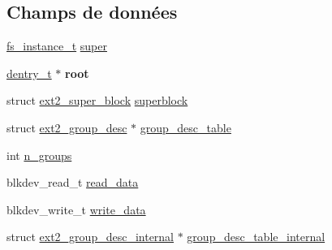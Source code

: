 \subsection*{Champs de données}
\begin{DoxyCompactItemize}
\item 
\hyperlink{vfs_8h_a0eefa9aac35a5462ebf1e038992ca860}{fs\-\_\-instance\-\_\-t} \hyperlink{struct__ext2__fs__instance__t_a456ee695fb1a0b71edadda9f4504ca2d}{super}
\item 
\hypertarget{struct__ext2__fs__instance__t_a52f883f2d709ab3b4dff94b5b7100973}{\hyperlink{vfs_8h_ade5c998c6b3f09d2cf45d0e5ef8787da}{dentry\-\_\-t} $\ast$ {\bfseries root}}\label{struct__ext2__fs__instance__t_a52f883f2d709ab3b4dff94b5b7100973}

\item 
struct \hyperlink{structext2__super__block}{ext2\-\_\-super\-\_\-block} \hyperlink{struct__ext2__fs__instance__t_a81ad8719743e20da6f661c2586b56ad2}{superblock}
\item 
struct \hyperlink{structext2__group__desc}{ext2\-\_\-group\-\_\-desc} $\ast$ \hyperlink{struct__ext2__fs__instance__t_acc01ef58cbc6cfa9d3ff4e08709a561a}{group\-\_\-desc\-\_\-table}
\item 
int \hyperlink{struct__ext2__fs__instance__t_a81a5e5b8f7d46d744c96a4f28317e59f}{n\-\_\-groups}
\item 
blkdev\-\_\-read\-\_\-t \hyperlink{struct__ext2__fs__instance__t_ac3ea85962b66914cb42ec884d70a853d}{read\-\_\-data}
\item 
blkdev\-\_\-write\-\_\-t \hyperlink{struct__ext2__fs__instance__t_a90d334c34e9aeea01be13fe1ed66ba7b}{write\-\_\-data}
\item 
struct \hyperlink{structext2__group__desc__internal}{ext2\-\_\-group\-\_\-desc\-\_\-internal} $\ast$ \hyperlink{struct__ext2__fs__instance__t_a9db69a1265be4c818005d18add117790}{group\-\_\-desc\-\_\-table\-\_\-internal}
\end{DoxyCompactItemize}


